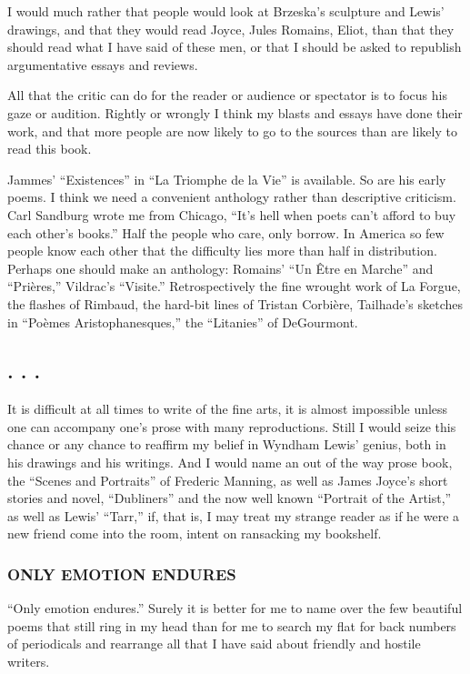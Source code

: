 I would much rather that people would look at Brzeska's sculpture and
Lewis' drawings, and that they would read Joyce, Jules Romains, Eliot,
than that they should read what I have said of these men, or that I
should be asked to republish argumentative essays and reviews.

All that the critic can do for the reader or audience or spectator is to
focus his gaze or audition. Rightly or wrongly I think my blasts and
essays have done their work, and that more people are now likely to go
to the sources than are likely to read this book.

Jammes' ``Existences'' in ``La Triomphe de la Vie'' is available. So are
his early poems. I think we need a convenient anthology rather than
descriptive criticism. Carl Sandburg wrote me from Chicago, ``It's hell
when poets can't afford to buy each other's books.'' Half the people who
care, only borrow. In America so few people know each other that the
difficulty lies more than half in distribution. Perhaps one should make
an anthology: Romains' ``Un Être en Marche'' and ``Prières,'' Vildrac's
``Visite.'' Retrospectively the fine wrought work of La Forgue, the
flashes of Rimbaud, the hard-bit lines of Tristan Corbière, Tailhade's
sketches in ``Poèmes Aristophanesques,'' the ``Litanies'' of DeGourmont.

\subsection{. . .}\label{section-3}

It is difficult at all times to write of the fine arts, it is almost
impossible unless one can accompany one's prose with many reproductions.
Still I would seize this chance or any chance to reaffirm my belief in
Wyndham Lewis' genius, both in his drawings and his writings. And I
would name an out of the way prose book, the ``Scenes and Portraits'' of
Frederic Manning, as well as James Joyce's short stories and novel,
``Dubliners'' and the now well known ``Portrait of the Artist,'' as well
as Lewis' ``Tarr,'' if, that is, I may treat my strange reader as if he
were a new friend come into the room, intent on ransacking my bookshelf.

\subsubsection{ONLY EMOTION ENDURES}\label{only-emotion-endures}

``Only emotion endures.'' Surely it is better for me to name over the
few beautiful poems that still ring in my head than for me to search my
flat for back numbers of periodicals and rearrange all that I have said
about friendly and hostile writers.

